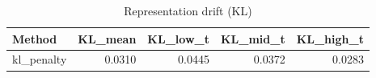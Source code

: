 \begin{table}[htbp]
\centering
\caption{Representation drift (KL)}
\label{tab:repr-drift}
\begin{tabular}{lrrrr}
\toprule
\textbf{Method} & \textbf{KL\_mean} & \textbf{KL\_low\_t} & \textbf{KL\_mid\_t} & \textbf{KL\_high\_t} \\
\midrule
kl\_penalty & 0.0310 & 0.0445 & 0.0372 & 0.0283 \\
\bottomrule
\end{tabular}
\end{table}